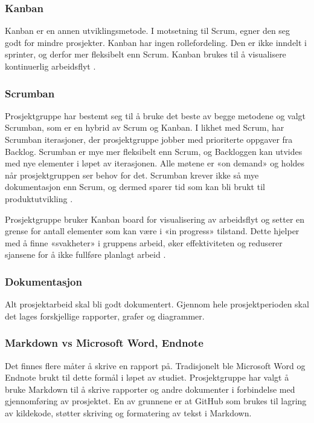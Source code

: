 \subsubsection*{Kanban}

Kanban er en annen utviklingsmetode. I motsetning til Scrum, egner den seg godt for mindre prosjekter. Kanban har ingen rollefordeling. Den er ikke inndelt i sprinter, og derfor mer fleksibelt enn Scrum. Kanban brukes til å visualisere kontinuerlig arbeidsflyt \cite{4-atlassian.com-kanban-vs-scrum}.
 
\subsubsection*{Scrumban}

Prosjektgruppe har bestemt seg til å bruke det beste av begge metodene og valgt Scrumban, som er en hybrid av Scrum og Kanban. I likhet med Scrum, har Scrumban iterasjoner, der prosjektgruppe jobber med prioriterte oppgaver fra Backlog. Scrumban er mye mer fleksibelt enn Scrum, og Backloggen kan utvides med nye elementer i løpet av iterasjonen. Alle møtene er «on demand» og holdes når prosjektgruppen ser behov for det. Scrumban krever ikke så mye dokumentasjon enn Scrum, og dermed sparer tid som kan bli brukt til produktutvikling \cite{4-logrocket.com-scrumban}.

Prosjektgruppe bruker Kanban board for visualisering av arbeidsflyt og setter en grense for antall elementer som kan være i «in progress» tilstand. Dette hjelper med å finne «svakheter» i gruppens arbeid, øker effektiviteten og reduserer sjansene for å ikke fullføre planlagt arbeid \cite{4-atlassian.com-wip-limits}.

\subsubsection{Dokumentasjon}

Alt prosjektarbeid skal bli godt dokumentert. Gjennom hele prosjektperioden skal det lages forskjellige rapporter, grafer og diagrammer.

\subsubsection*{Markdown vs Microsoft Word, Endnote}

Det finnes flere måter å skrive en rapport på. Tradisjonelt ble Microsoft Word og Endnote brukt til dette formål i løpet av studiet. Prosjektgruppe har valgt å bruke Markdown til å skrive rapporter og andre dokumenter i forbindelse med gjennomføring av prosjektet. En av grunnene er at GitHub som brukes til lagring av kildekode, støtter skriving og formatering av tekst i Markdown.


